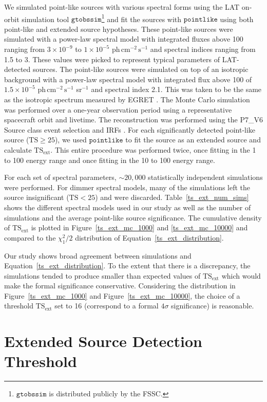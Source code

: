\documentclass[12pt,preprint]{aastex}
\newcommand{\mev}{\text{MeV}\xspace}
\newcommand{\gev}{\text{GeV}\xspace}
\newcommand{\phflux}{\ensuremath{\text{ph}\,\text{cm}^{-2}\,\text{s}^{-1}}\xspace}
\newcommand{\tsext}{{\ensuremath{\text{TS}_{\text{ext}}}}\xspace}
\newcommand{\ts}{\text{TS}\xspace}
\newcommand{\pointlike}{\ensuremath{\mathtt{pointlike}}\xspace}
\newcommand{\gtobssim}{\ensuremath{\mathtt{gtobssim}}\xspace}
\begin{document}
We simulated point-like sources with various spectral forms using
the LAT on-orbit simulation tool
\gtobssim\footnote{\gtobssim is distributed publicly by the FSSC.} and fit the sources
with \pointlike using both point-like
and extended source hypotheses.  These point-like sources were simulated with a power-law
spectral model with integrated fluxes above 100 \mev ranging from $3\times10^{-9}$ 
to $1\times10^{-5}$ \phflux and spectral
indices ranging from 1.5 to 3.  These values
were picked to represent typical parameters of LAT-detected
sources. The point-like sources were simulated on top of an isotropic
background with a power-law spectral model with
integrated flux above 100 \mev of $1.5\times10^{-5}$ \phflux sr$^{-1}$
and spectral index 2.1.
This was
taken to be the same as the isotropic spectrum measured by EGRET
\citep{sreekumar_isotropic}.  The Monte Carlo simulation was performed
over a one-year observation period using a representative 
spacecraft orbit and livetime.
The reconstruction was performed
using the P7\_V6 Source class event selection and IRFs \citep{lat_on_orbit_psf}. For each 
significantly detected point-like source ($\ts\ge25$), we used \pointlike
to fit the source as an extended source and calculate \tsext.
This entire procedure was performed twice, once fitting in the 1 \gev
to 100 \gev energy range and once fitting in the 10 \gev to 100 \gev
energy range.

For each set of spectral parameters, $\sim20,000$ statistically independent
simulations were performed. For dimmer spectral models, many of the
simulations left the source insignificant ($\ts<25$)
and were discarded.  Table~\ref{ts_ext_num_sims}
shows the different spectral models used in our study as well as the
number of simulations and the average point-like source
significance.  The cumulative density of \tsext is plotted in
Figure~\ref{ts_ext_mc_1000} and \ref{ts_ext_mc_10000} 
and compared to the $\chi^2_1/2$ distribution of
Equation~\ref{ts_ext_distribution}.

Our study shows broad agreement between simulations and
Equation~\ref{ts_ext_distribution}. To the extent that there is
a discrepancy, the simulations tended to produce smaller than expected
values of \tsext which would make the formal significance conservative.
Considering the distribution in Figure~\ref{ts_ext_mc_1000} and
Figure~\ref{ts_ext_mc_10000}, the choice of a threshold \tsext set to 16
(correspond to a formal $4\sigma$ significance) is reasonable.


\section{Extended Source Detection Threshold}
\label{extension_sensitivity}
\end{document}
